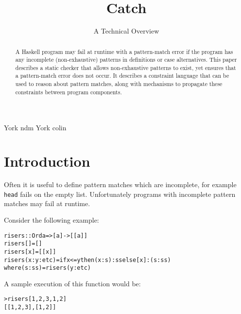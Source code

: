 \documentclass[preprint]{sigplanconf}
\newcommand{\T}[1]{\texttt{#1}}
\newenvironment{code}{\begin{alltt}\small}{\end{alltt}}
\begin{document}
\copyrightdata{[to be supplied]}

\titlebanner{}        %

\title{Catch}
\subtitle{A Technical Overview}

           {York}
           {ndm}
           {York}
           {colin}

\maketitle

\begin{abstract}
A Haskell program may fail at runtime with a pattern-match error if the program
has any incomplete (non-exhaustive) patterns in definitions or case
alternatives. This paper describes a static checker that allows non-exhaustive
patterns to exist, yet ensures that a pattern-match error does not occur. It
describes a constraint language that can be used to reason about pattern
matches, along with mechanisms to propagate these constraints between program
components.
\end{abstract}




\section{Introduction}
\label{sec:introduction}

Often it is useful to define pattern matches which are incomplete,
for example \T{head} fails on the empty list. Unfortunately programs
with incomplete pattern matches may fail at runtime.

Consider the following example:

\begin{code}
risers :: Ord a => [a] -> [[a]]
risers [] = []
risers [x] = [[x]]
risers (x:y:etc) = if x <= y then (x:s):ss else [x]:(s:ss)
    where (s:ss) = risers (y:etc)
\end{code}

A sample execution of this function would be:

\begin{code}
> risers [1,2,3,1,2]
[[1,2,3],[1,2]]
\end{code}
\end{document}
